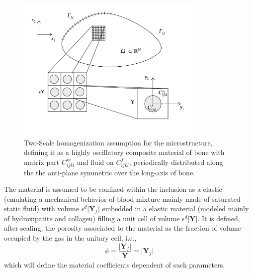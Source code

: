 \begin{figure}[!h]
	\centering
	\includegraphics[width=0.8\textwidth]{images/HomSchemes/HomBasicScheme.png}
	\caption{Two-Scale homogenization assumption for the microstructure, defining it as a highly oscillatory composite material of bone with matrix part $C^m_{ijkl}$ and fluid on $C^f_{ijkl}$, periodically distributed along the the anti-plane symmetric over the long-axis of bone.}
	\label{HomBasicScheme}
\end{figure}

\begin{rem}
The material is assumed to be confined within the inclusion as a elastic (emulating a mechanical behavior of blood mixture mainly made of saturated static fluid) with volume $\epsilon^d \vert \mathbf{Y}_f \vert$ embedded in a elastic material (modeled mainly of hydroxipatite and collagen) filling a unit cell of volume $\epsilon^d \vert \mathbf{Y} \vert$.
It is defined, after scaling, the porosity associated to the material as the fraction of volume occupied by the gas in the unitary cell, i.e., 
\begin{equation*}
\phi = \frac{\vert \mathbf{Y}_f \vert}{\vert \mathbf{Y} \vert} = \vert \mathbf{Y}_f \vert
\end{equation*}
which will define the material coefficients dependent of such parameters.
\end{rem}


